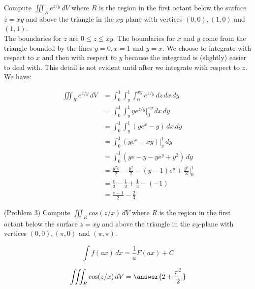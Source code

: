 \documentclass[handout]{ximera}
\begin{document}
\begin{example}[Example 3]
Compute $\iiint_R  e^{z/y} \, dV$ where $R$ is the region in the first octant below the 
surface $z = xy$ and above the triangle in the $xy$-plane with vertices $(0,0), (1,0)$ and $(1,1)$.\\


The boundaries for $z$ are $0 \leq z \leq xy$. The boundaries for $x$ and $y$ come from the triangle bounded by the lines
$y = 0, x = 1$ and $y = x$.  We choose to integrate with respect to $x$ and then with respect to $y$ because the
integrand is (slightly) easier to deal with.  This detail is not evident until after we integrate with respect to $z$.
We have:

\begin{align*}
\iiint_R e^{z/y} \, dV & = \int_0^1 \int_y^1 \int_0^{xy} e^{z/y} \, dz \, dx \, dy\\
                 & = \int_0^1 \int_y^1 ye^{z/y}\bigg|_{0}^{xy} \,dx \, dy\\
                 & = \int_0^1 \int_y^1 \left(ye^x - y\right) \,dx \, dy\\
                 &= \int_0^1 \left(ye^x - xy\right) \bigg|_y^1 \, dy\\
                 &= \int_0^1 \left(ye - y - ye^y + y^2\right) \, dy\\
                 &= \frac{y^2 e}{2} - \frac{y^2}{2} - (y-1)e^y + \frac{y^3}{3} \bigg|_0^1\\
                 &= \frac{e}{2} - \frac12 + \frac13 - (-1)\\
                 &= \frac{e-1}{2} - \frac23
\end{align*} 

\end{example}

\begin{problem}(Problem 3)
Compute $\iiint_R  cos(z/x) \, dV$ where $R$ is the region in the first octant below the 
surface $z = xy$ and above the triangle in the $xy$-plane with vertices $(0,0), (\pi, 0)$ and $(\pi, \pi)$.\\
\begin{hint}
\[
\int f(ax) \, dx = \frac{1}{a} F(ax) + C
\]
\end{hint}
\[
\iiint_R  \cos(z/x) \, dV = \answer{2 +\frac{\pi^2}{2}}
\]

\end{problem}
\end{document}
